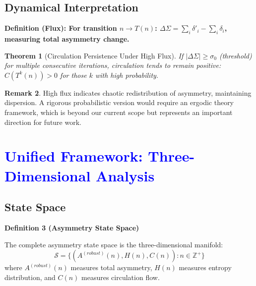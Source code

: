 \documentclass[11pt,a4paper]{article}
\theoremstyle{plain}
\newtheorem{theorem}{Theorem}[section]
\theoremstyle{definition}
\newtheorem{remark}[theorem]{Remark}
\newenvironment{definitionbox}
    {\begin{center}\begin{minipage}{0.95\textwidth}\color{blue}\bfseries}
    {\end{minipage}\end{center}}
\begin{document}
\subsection{Dynamical Interpretation}

\begin{definitionbox}
\textbf{Definition (Flux):}
For transition $n \to T(n)$: $\Delta\Sigma = \sum_i \delta'_i - \sum_i \delta_i$, measuring total asymmetry change.
\end{definitionbox}

\begin{theorem}[Circulation Persistence Under High Flux]\label{thm:circ_persist}
If $|\Delta\Sigma| \geq \sigma_0$ (threshold) for multiple consecutive iterations, circulation tends to remain positive: $C(T^k(n)) > 0$ for those $k$ with high probability.
\end{theorem}

\begin{remark}
High flux indicates chaotic redistribution of asymmetry, maintaining dispersion. A rigorous probabilistic version would require an ergodic theory framework, which is beyond our current scope but represents an important direction for future work.
\end{remark}

\section{\textcolor{blue}{Unified Framework: Three-Dimensional Analysis}}

\subsection{State Space}

\begin{definitionbox}
\textbf{Definition 3 (Asymmetry State Space)}\label{def:state_space}

The complete asymmetry state space is the three-dimensional manifold:
\[
\mathcal{S} = \{(A^{(robust)}(n), H(n), C(n)) : n \in \mathbb{Z}^+\}
\]
where $A^{(robust)}(n)$ measures total asymmetry, $H(n)$ measures entropy distribution, and $C(n)$ measures circulation flow.
\end{definitionbox}

\end{document}
